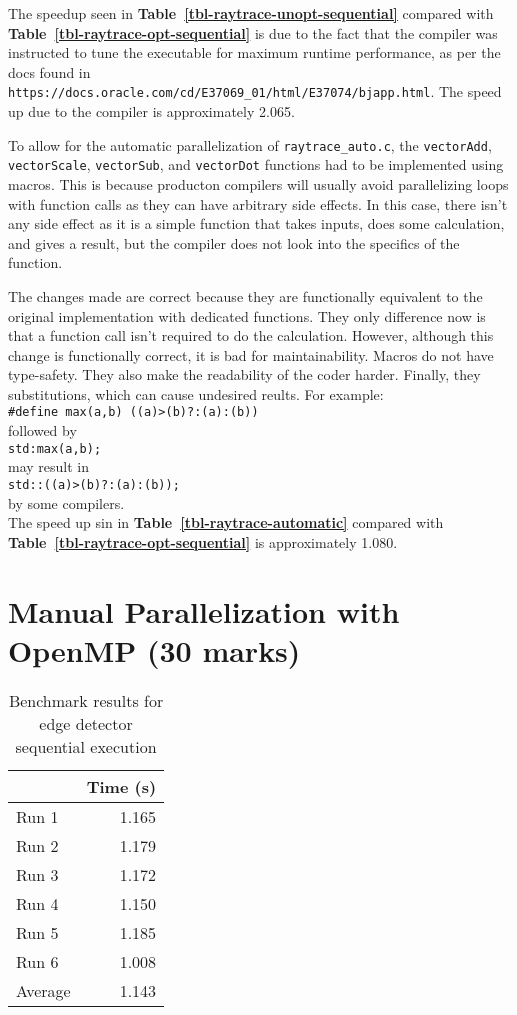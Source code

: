 \documentclass[12pt]{article}
\begin{document}
The speedup seen in {\bf Table~\ref{tbl-raytrace-unopt-sequential}} compared with {\bf Table~\ref{tbl-raytrace-opt-sequential}} is due to the fact that the compiler was instructed to tune the executable for maximum runtime performance, as per the docs found in {\tt https://docs.oracle.com/cd/E37069\_01/html/E37074/bjapp.html}. The speed up due to the compiler is approximately 2.065.

To allow for the automatic parallelization of {\tt raytrace\_auto.c}, the {\tt vectorAdd}, {\tt vectorScale}, {\tt vectorSub}, and {\tt vectorDot} functions had to be implemented using macros. This is because producton compilers will usually avoid parallelizing loops with function calls as they can have arbitrary side effects. In this case, there isn't any side effect as it is a simple function that takes inputs, does some calculation, and gives a result, but the compiler does not look into the specifics of the function.

The changes made are correct because they are functionally equivalent to the original implementation with dedicated functions. They only difference now is that a function call isn't required to do the calculation. However, although this change is functionally correct, it is bad for maintainability. Macros do not have type-safety. They also make the readability of the coder harder. Finally, they substitutions, which can cause undesired reults. For example: \\
{\tt \#define max(a,b) ((a)>(b)?:(a):(b))} \\
followed by \\
{\tt std:max(a,b);} \\
may result in \\
{\tt std::((a)>(b)?:(a):(b));} \\
by some compilers. \\

The speed up sin in {\bf Table~\ref{tbl-raytrace-automatic}} compared with {\bf Table~\ref{tbl-raytrace-opt-sequential}} is approximately 1.080.

\section*{Manual Parallelization with OpenMP (30 marks)}

\begin{table}[H]
  \centering
  \begin{tabular}{lr}
    & {\bf Time (s)} \\
    \hline
    Run 1 & 1.165 \\
    Run 2 & 1.179 \\
    Run 3 & 1.172 \\
    Run 4 & 1.150 \\
    Run 5 & 1.185 \\
    Run 6 & 1.008 \\
    \hline
    Average & 1.143 \\
  \end{tabular}
  \caption{Benchmark results for edge detector sequential execution}
  \label{tbl-canny-edge-sequential}
\end{table}
\end{document}
